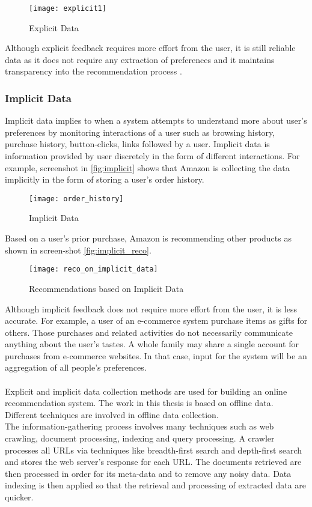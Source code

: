 \begin{figure}[H]
	\centering
	\texttt{[image: explicit1]}
	\caption{Explicit Data \cite{36}}
	\label{fig:explicit}
\end{figure}

\noindent Although explicit feedback requires more effort from the user, it is still reliable data as it does not require any extraction of preferences and it maintains transparency into the recommendation process \cite{35}.

\subsubsection{Implicit Data}

Implicit data implies to when a system attempts to understand more about user's preferences by monitoring interactions of a user such as browsing history, purchase history, button-clicks, links followed by a user. Implicit data is information provided by user discretely in the form of different interactions. For example, screenshot in \autoref{fig:implicit} shows that Amazon is collecting the data implicitly in the form of storing a user's order history.
\begin{figure}[H]
	\centering
	\texttt{[image: order\_history]}
	\caption{Implicit Data \cite{53}}
	\label{fig:implicit}
\end{figure}

\noindent Based on a user's prior purchase, Amazon is recommending other products as shown in screen-shot \autoref{fig:implicit_reco}.

\begin{figure}[H]
	\centering
	\texttt{[image: reco\_on\_implicit\_data]}
	\caption{Recommendations based on Implicit Data \cite{53}}
	\label{fig:implicit_reco}
\end{figure}


\noindent Although implicit feedback does not require more effort from the user, it is less accurate. For example, a user of an e-commerce system purchase items as gifts for others. Those purchases and related activities do not necessarily communicate anything about the user’s tastes. A whole family may share a single account for purchases from e-commerce websites. In that case, input for the system will be an aggregation of all people's preferences.
\\
\\
Explicit and implicit data collection methods are used for building an online recommendation system. The work in this thesis is based on offline data. Different techniques are involved in offline data collection. \\
The information-gathering process involves many techniques such as web crawling, document processing, indexing and query processing. A crawler processes all URLs via techniques like breadth-first search and depth-first search and stores the web server's response for each URL. The documents retrieved are then processed in order for its meta-data and to remove any noisy data. Data indexing is then applied so that the retrieval and processing of extracted data are quicker.


